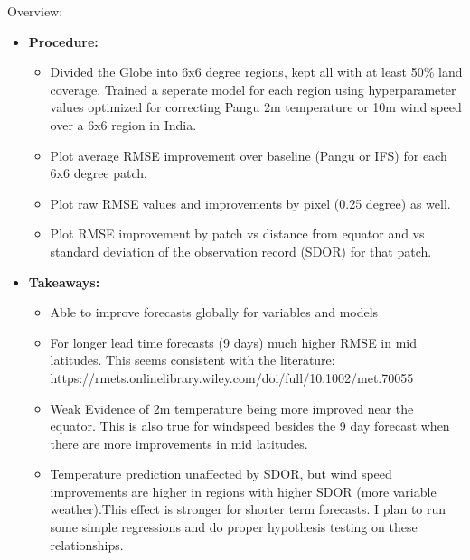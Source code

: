 \documentclass[11pt,letterpaper]{article}
\begin{document}
Overview:
\begin{itemize}
    \item \textbf{Procedure:} 

    \begin{itemize}
        \item Divided the Globe into 6x6 degree regions, kept all with at least 50\% land coverage. Trained a seperate model for each region using hyperparameter values optimized for correcting Pangu 2m temperature or 10m wind speed over a 6x6 region in India. 
        \item Plot average RMSE improvement over baseline (Pangu or IFS) for each 6x6 degree patch. 
        \item Plot raw RMSE values and improvements by pixel (0.25 degree) as well.
        \item Plot RMSE improvement by patch vs distance from equator and vs standard deviation of the observation record (SDOR) for that patch.
    \end{itemize}
    \item \textbf{Takeaways:}
    \begin{itemize}
        \item Able to improve forecasts globally for variables and models
        \item For longer lead time forecasts (9 days) much higher RMSE in mid latitudes. This seems consistent with the literature: https://rmets.onlinelibrary.wiley.com/doi/full/10.1002/met.70055
        \item Weak Evidence of 2m temperature being more improved near the equator. This is also true for windspeed besides the 9 day forecast when there are more improvements in mid latitudes.
        \item Temperature prediction unaffected by SDOR, but wind speed improvements are higher in regions with higher SDOR (more variable weather).This effect is stronger for shorter term forecasts. I plan to run some simple regressions and do proper hypothesis testing on these relationships.
    \end{itemize}

    
\end{itemize}
\end{document}
